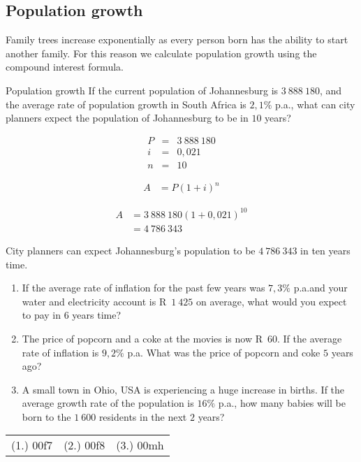 \subsection{Population growth}

Family trees increase exponentially as every person born has the ability to start another family. For this reason we calculate population growth using the compound interest formula.


\begin{wex}{Population growth}
    {If the current population of Johannesburg is $3~888~180$, and the average rate of population growth in South Africa is $2,1\%$ p.a., what can city planners expect the population of Johannesburg to be in $10$ years?}{
    
    \begin{eqnarray*}
	P &=& 3~888~180\\
	i &=& 0,021\\
	n &=& 10
    \end{eqnarray*}

    \begin{align*}
	A &= P(1 + i)^n
    \end{align*}

    \begin{align*}
	A &= 3~888~180(1 + 0,021)^{10}\\
	  &= 4~786~343
    \end{align*}

    City planners can expect Johannesburg's population to be $4~786~343$ in ten years time.
    }
\end{wex}


\begin{exercises}{}{
    \begin{enumerate}[label=\textbf{\arabic*}.]
	\item If the average rate of inflation for the past few years was $7,3\%$ p.a.\@ and your water and electricity account is R~$1~425$ on average, what would you expect to pay in $6$ years time?

	\item The price of popcorn and a coke at the movies is now R~$60$. If the average rate of inflation is $9,2\%$ p.a. What was the price of popcorn and coke $5$ years ago?

	\item A small town in Ohio, USA is experiencing a huge increase in births. If the average growth rate of the population is $16\%$ p.a., how many babies will be born to the $1~600$ residents in the next $2$ years?\\
    \end{enumerate}
\practiceinfo

    \begin{tabularx}{\textwidth}{ XXX }
	(1.) 00f7&	(2.) 00f8&	(3.) 00mh
    \end{tabularx}
}
\end{exercises}



